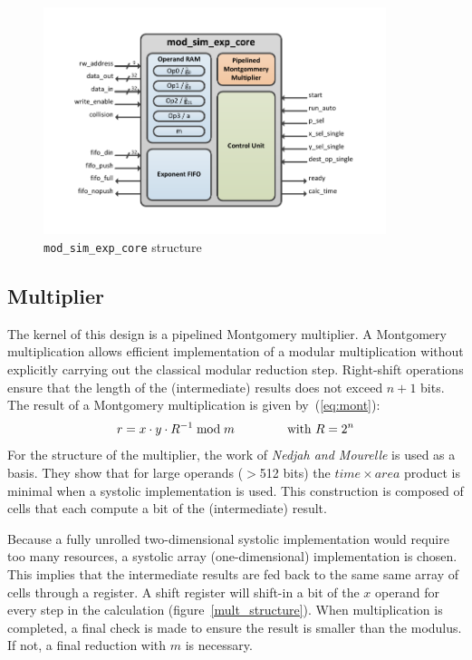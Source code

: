 \begin{figure}[H]
\centering
\includegraphics[trim=1.2cm 1.2cm 1.2cm 1.2cm, width=10cm]{pictures/mod_sim_exp_core.pdf}
\cprotect\caption{\verb|mod_sim_exp_core| structure}
\label{msec_structure}
\end{figure}

\subsection{Multiplier}
The kernel of this design is a pipelined Montgomery multiplier. A Montgomery multiplication\cite{MontModMul} allows efficient implementation of a
modular multiplication without explicitly carrying out the classical modular reduction step. Right-shift operations ensure that the length of the (intermediate) results does not exceed $n+1$ bits. The result of a Montgomery multiplication is given by~(\ref{eq:mont}):
\begin{align}\label{eq:mont}
r = x \cdot y \cdot R^{-1} \bmod m \hspace{1.5cm}\text{with } R = 2^{n}
\end{align}
For the structure of the multiplier, the work of \textit{Nedjah and Mourelle}\cite{NedMour} is used as a basis. They show that for large operands ($>$512 bits) the $time\times area$ product is minimal when a systolic implementation is used. This construction is composed of cells that each compute a bit of the (intermediate) result.

Because a fully unrolled two-dimensional systolic implementation would require too many resources, a systolic array (one-dimensional) implementation is chosen. This implies that the intermediate results are fed back to the same same array of cells through a register. A shift register will shift-in a bit of the $x$ operand for every step in the calculation (figure~\ref{mult_structure}). When multiplication is completed, a final check is made to ensure the result is smaller than the modulus. If not, a final reduction with $m$ is necessary.

